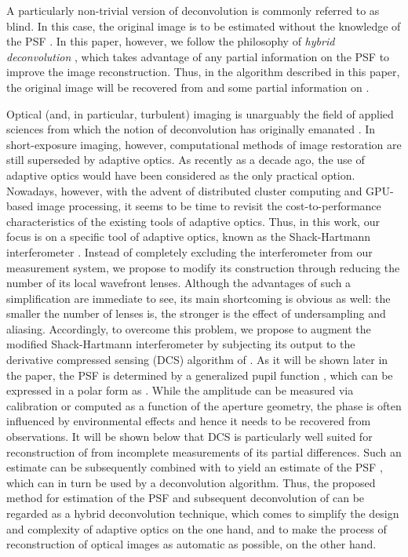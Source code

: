 \pdfoutput=1 \documentclass[journal]{IEEEtran}
\begin{document}
A particularly non-trivial version of deconvolution is commonly referred to as blind. In this case, the original image  is to be estimated without the knowledge of the PSF \cite{42}. In this paper, however, we follow the philosophy of {\em hybrid deconvolution} \cite{Oleg07}, which takes advantage of any partial information on the PSF to improve the image reconstruction. Thus, in the algorithm described in this paper, the original image  will be recovered from  and some partial information on .

Optical (and, in particular, turbulent) imaging is unarguably the field of applied sciences from which the notion of deconvolution has originally emanated \cite{Richardson72, Lucy74, 44}. In short-exposure imaging, however, computational methods of image restoration are still superseded by adaptive optics. As recently as a decade ago, the use of adaptive optics would have been considered as the only practical option. Nowadays, however, with the advent of distributed cluster computing and GPU-based image processing, it seems to be time to revisit the cost-to-performance characteristics of the existing tools of adaptive optics. Thus, in this work, our focus is on a specific tool of adaptive optics, known as the Shack-Hartmann interferometer \cite{12, 18}. Instead of completely excluding the interferometer from our measurement system, we propose to  modify its construction through reducing the number of its local wavefront lenses. Although the advantages of such a simplification are immediate to see, its main shortcoming is obvious as well: the smaller the number of lenses is, the stronger is the effect of undersampling and aliasing. Accordingly, to overcome this problem, we propose to augment the modified Shack-Hartmann interferometer by subjecting its output to the derivative compressed sensing (DCS) algorithm of \cite{14}. As it will be shown later in the paper, the PSF  is determined by a generalized pupil function , which can be expressed in a polar form as . While the amplitude  can be measured via calibration or computed as a function of the aperture geometry, the phase  is often influenced by environmental effects and hence it needs to be recovered from observations. It will be shown below that DCS is particularly well suited for reconstruction of  from incomplete measurements of its partial differences. Such an estimate can be subsequently combined with  to yield an estimate of the PSF , which can in turn be used by a deconvolution algorithm. Thus, the proposed method for estimation of the PSF and subsequent deconvolution of  can be regarded as a hybrid deconvolution technique, which comes to simplify the design and complexity of adaptive optics on the one hand, and to make the process of reconstruction of optical images as automatic as possible, on the other hand.
\end{document}
